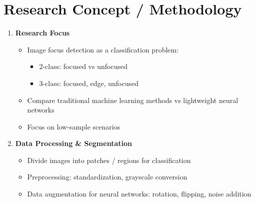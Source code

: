 \section{Research Concept / Methodology}
\begin{enumerate}
    \item \textbf{Research Focus}
          \begin{itemize}
              \item Image focus detection as a classification problem:
                    \begin{itemize}
                        \item 2-class: focused vs unfocused
                        \item 3-class: focused, edge, unfocused
                    \end{itemize}
              \item Compare traditional machine learning methods vs lightweight neural networks
              \item Focus on low-sample scenarios
          \end{itemize}

    \item \textbf{Data Processing \& Segmentation}
          \begin{itemize}
              \item Divide images into patches / regions for classification
              \item Preprocessing: standardization, grayscale conversion
              \item Data augmentation for neural networks: rotation, flipping, noise addition
          \end{itemize}


\end{enumerate}
